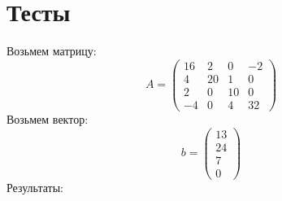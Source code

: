 \documentclass[14pt, titlepage,fleqn]{extarticle}
\begin{document}
	\section*{Тесты}
	Возьмем матрицу:
	\[A = \begin{pmatrix}
		16& 2& 0& -2\\
        4& 20& 1& 0\\
        2& 0& 10& 0\\
        -4& 0& 4& 32
	\end{pmatrix}\]
	Возьмем вектор:
	\[b =\begin{pmatrix}
		13\\
		24\\
		7\\
		0
	\end{pmatrix} \]
	Результаты:
	\begin{figure}[H]
	\end{figure}
\end{document}
